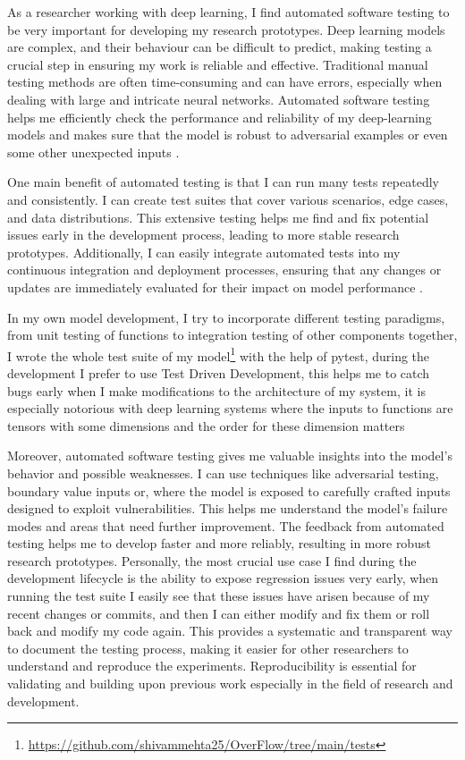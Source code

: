 \documentclass[11pt]{article}
\begin{document}
As a researcher working with deep learning, I find automated software testing to be very important for developing my research prototypes. Deep learning models are complex, and their behaviour can be difficult to predict, making testing a crucial step in ensuring my work is reliable and effective. Traditional manual testing methods are often time-consuming and can have errors, especially when dealing with large and intricate neural networks. Automated software testing helps me efficiently check the performance and reliability of my deep-learning models and makes sure that the model is robust to adversarial examples or even some other unexpected inputs \cite{mccoy2019right}.

One main benefit of automated testing is that I can run many tests repeatedly and consistently. I can create test suites that cover various scenarios, edge cases, and data distributions. This extensive testing helps me find and fix potential issues early in the development process, leading to more stable research prototypes. Additionally, I can easily integrate automated tests into my continuous integration and deployment processes, ensuring that any changes or updates are immediately evaluated for their impact on model performance \cite{kaushik2019learning}.

In my own model development, I try to incorporate different testing paradigms, from unit testing of functions to integration testing of other components together, I wrote the whole test suite of my model\footnote{\url{https://github.com/shivammehta25/OverFlow/tree/main/tests}}  with the help of pytest, during the development I prefer to use Test Driven Development, this helps me to catch bugs early when I make modifications to the architecture of my system, it is especially notorious with deep learning systems where the inputs to functions are tensors with some dimensions and the order for these dimension matters

Moreover, automated software testing gives me valuable insights into the model's behavior and possible weaknesses. I can use techniques like adversarial testing, boundary value inputs or, where the model is exposed to carefully crafted inputs designed to exploit vulnerabilities. This helps me understand the model's failure modes and areas that need further improvement. The feedback from automated testing helps me to develop faster and more reliably, resulting in more robust research prototypes.
Personally, the most crucial use case I find during the development lifecycle is the ability to expose regression issues very early, when running the test suite I easily see that these issues have arisen because of my recent changes or commits, and then I can either modify and fix them or roll back and modify my code again. This provides a systematic and transparent way to document the testing process, making it easier for other researchers to understand and reproduce the experiments. Reproducibility is essential for validating and building upon previous work especially in the field of research and development.
\end{document}
